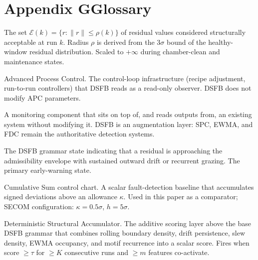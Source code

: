 \documentclass[11pt,letterpaper]{article}
\theoremstyle{scresult}
\begin{document}
\clearpage

\section*{Appendix G\quad Glossary}
\label{app:glossary}

\begin{description}[leftmargin=2.4cm, labelwidth=2.2cm, style=nextline,
                    itemsep=4pt, parsep=0pt]

\item[\textbf{Admissibility envelope}]
The set $\mathcal{E}(k) = \{r:\|r\|\leq\rho(k)\}$ of residual values
considered structurally acceptable at run $k$.  Radius $\rho$ is derived
from the $3\sigma$ bound of the healthy-window residual distribution.
Scaled to $+\infty$ during chamber-clean and maintenance states.

\item[\textbf{APC}]
Advanced Process Control.  The control-loop infrastructure (recipe
adjustment, run-to-run controllers) that DSFB reads as a read-only observer.
DSFB does not modify APC parameters.

\item[\textbf{Augmentation layer}]
A monitoring component that sits on top of, and reads outputs from, an
existing system without modifying it.  DSFB is an augmentation layer: SPC,
EWMA, and FDC remain the authoritative detection systems.

\item[\textbf{Boundary (grammar state)}]
The DSFB grammar state indicating that a residual is approaching the
admissibility envelope with sustained outward drift or recurrent grazing.
The primary early-warning state.

\item[\textbf{CUSUM}]
Cumulative Sum control chart.  A scalar fault-detection baseline that
accumulates signed deviations above an allowance $\kappa$.  Used in this
paper as a comparator; SECOM configuration: $\kappa=0.5\sigma$, $h=5\sigma$.

\item[\textbf{DSA}]
Deterministic Structural Accumulator.  The additive scoring layer above the
base DSFB grammar that combines rolling boundary density, drift persistence,
slew density, EWMA occupancy, and motif recurrence into a scalar score.
Fires when score $\geq\tau$ for $\geq K$ consecutive runs and $\geq m$
features co-activate.


\end{description}
\end{document}
